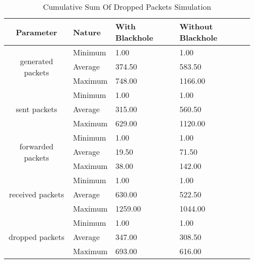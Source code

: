 \begin{table}[]
	\begin{tabular}{|c|l|l|l|}
		\hline
		\textbf{Parameter}                 & \textbf{Nature} & \textbf{With Blackhole} & \textbf{Without Blackhole} \\ \hline
		\multirow{3}{*}{generated packets} & Minimum         & 1.00                    & 1.00                       \\ \cline{2-4}
		& Average         & 374.50                  & 583.50                     \\ \cline{2-4}
		& Maximum         & 748.00                  & 1166.00                    \\ \hline
		\multirow{3}{*}{sent packets}      & Minimum         & 1.00                    & 1.00                       \\ \cline{2-4}
		& Average         & 315.00                  & 560.50                     \\ \cline{2-4}
		& Maximum         & 629.00                  & 1120.00                    \\ \hline
		\multirow{3}{*}{forwarded packets} & Minimum         & 1.00                    & 1.00                       \\ \cline{2-4}
		& Average         & 19.50                   & 71.50                      \\ \cline{2-4}
		& Maximum         & 38.00                   & 142.00                     \\ \hline
		\multirow{3}{*}{received packets}  & Minimum         & 1.00                    & 1.00                       \\ \cline{2-4}
		& Average         & 630.00                  & 522.50                     \\ \cline{2-4}
		& Maximum         & 1259.00                 & 1044.00                    \\ \hline
		\multirow{3}{*}{dropped packets}   & Minimum         & 1.00                    & 1.00                       \\ \cline{2-4}
		& Average         & 347.00                  & 308.50                     \\ \cline{2-4}
		& Maximum         & 693.00                  & 616.00                     \\ \hline
	\end{tabular}
	\caption{Cumulative Sum Of Dropped Packets Simulation}
	\label{tab:sum}
\end{table}

